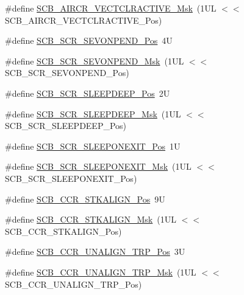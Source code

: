 \begin{DoxyCompactItemize}
\item 
\#define \mbox{\hyperlink{group___c_m_s_i_s___s_c_b_ga212c5ab1c1c82c807d30d2307aa8d218}{S\+C\+B\+\_\+\+A\+I\+R\+C\+R\+\_\+\+V\+E\+C\+T\+C\+L\+R\+A\+C\+T\+I\+V\+E\+\_\+\+Msk}}~(1\+U\+L $<$$<$ S\+C\+B\+\_\+\+A\+I\+R\+C\+R\+\_\+\+V\+E\+C\+T\+C\+L\+R\+A\+C\+T\+I\+V\+E\+\_\+\+Pos)
\item 
\#define \mbox{\hyperlink{group___c_m_s_i_s___s_c_b_ga3bddcec40aeaf3d3a998446100fa0e44}{S\+C\+B\+\_\+\+S\+C\+R\+\_\+\+S\+E\+V\+O\+N\+P\+E\+N\+D\+\_\+\+Pos}}~4U
\item 
\#define \mbox{\hyperlink{group___c_m_s_i_s___s_c_b_gafb98656644a14342e467505f69a997c9}{S\+C\+B\+\_\+\+S\+C\+R\+\_\+\+S\+E\+V\+O\+N\+P\+E\+N\+D\+\_\+\+Msk}}~(1\+U\+L $<$$<$ S\+C\+B\+\_\+\+S\+C\+R\+\_\+\+S\+E\+V\+O\+N\+P\+E\+N\+D\+\_\+\+Pos)
\item 
\#define \mbox{\hyperlink{group___c_m_s_i_s___s_c_b_gab304f6258ec03bd9a6e7a360515c3cfe}{S\+C\+B\+\_\+\+S\+C\+R\+\_\+\+S\+L\+E\+E\+P\+D\+E\+E\+P\+\_\+\+Pos}}~2U
\item 
\#define \mbox{\hyperlink{group___c_m_s_i_s___s_c_b_ga77c06a69c63f4b3f6ec1032e911e18e7}{S\+C\+B\+\_\+\+S\+C\+R\+\_\+\+S\+L\+E\+E\+P\+D\+E\+E\+P\+\_\+\+Msk}}~(1\+U\+L $<$$<$ S\+C\+B\+\_\+\+S\+C\+R\+\_\+\+S\+L\+E\+E\+P\+D\+E\+E\+P\+\_\+\+Pos)
\item 
\#define \mbox{\hyperlink{group___c_m_s_i_s___s_c_b_ga3680a15114d7fdc1e25043b881308fe9}{S\+C\+B\+\_\+\+S\+C\+R\+\_\+\+S\+L\+E\+E\+P\+O\+N\+E\+X\+I\+T\+\_\+\+Pos}}~1U
\item 
\#define \mbox{\hyperlink{group___c_m_s_i_s___s_c_b_ga50a243e317b9a70781b02758d45b05ee}{S\+C\+B\+\_\+\+S\+C\+R\+\_\+\+S\+L\+E\+E\+P\+O\+N\+E\+X\+I\+T\+\_\+\+Msk}}~(1\+U\+L $<$$<$ S\+C\+B\+\_\+\+S\+C\+R\+\_\+\+S\+L\+E\+E\+P\+O\+N\+E\+X\+I\+T\+\_\+\+Pos)
\item 
\#define \mbox{\hyperlink{group___c_m_s_i_s___s_c_b_gac2d20a250960a432cc74da59d20e2f86}{S\+C\+B\+\_\+\+C\+C\+R\+\_\+\+S\+T\+K\+A\+L\+I\+G\+N\+\_\+\+Pos}}~9U
\item 
\#define \mbox{\hyperlink{group___c_m_s_i_s___s_c_b_ga33cf22d3d46af158a03aad25ddea1bcb}{S\+C\+B\+\_\+\+C\+C\+R\+\_\+\+S\+T\+K\+A\+L\+I\+G\+N\+\_\+\+Msk}}~(1\+U\+L $<$$<$ S\+C\+B\+\_\+\+C\+C\+R\+\_\+\+S\+T\+K\+A\+L\+I\+G\+N\+\_\+\+Pos)
\item 
\#define \mbox{\hyperlink{group___c_m_s_i_s___s_c_b_gac4e4928b864ea10fc24dbbc57d976229}{S\+C\+B\+\_\+\+C\+C\+R\+\_\+\+U\+N\+A\+L\+I\+G\+N\+\_\+\+T\+R\+P\+\_\+\+Pos}}~3U
\item 
\#define \mbox{\hyperlink{group___c_m_s_i_s___s_c_b_ga68c96ad594af70c007923979085c99e0}{S\+C\+B\+\_\+\+C\+C\+R\+\_\+\+U\+N\+A\+L\+I\+G\+N\+\_\+\+T\+R\+P\+\_\+\+Msk}}~(1\+U\+L $<$$<$ S\+C\+B\+\_\+\+C\+C\+R\+\_\+\+U\+N\+A\+L\+I\+G\+N\+\_\+\+T\+R\+P\+\_\+\+Pos)

\end{DoxyCompactItemize}
